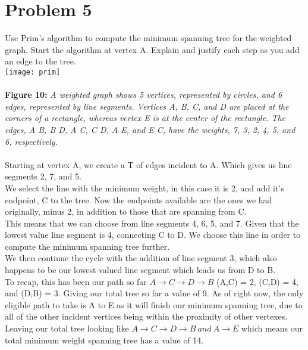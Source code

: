   \section*{Problem 5}
  Use Prim's algorithm to compute the minimum spanning tree for the weighted graph. Start the algorithm at vertex A. Explain and justify each step as you add an edge to the tree.
\\
\texttt{[image: prim]}
\\\\
{\color{blue} {\bf Figure 10:} \emph{A weighted graph shows 5 vertices, represented by circles, and 6 edges, represented by line segments. Vertices A, B, C, and D are placed at the corners of a rectangle, whereas vertex E is at the center of the rectangle. The edges, A B, B D, A C, C D, A E, and E C, have the weights, 7, 3, 2, 4, 5, and 6, respectively.
  }
}
\\\\
  Starting at vertex A, we create a T of edges incident to A. Which gives us line segments 2, 7, and 5. \\
  
  We select the line with the minimum weight, in this case it is 2, and add it's endpoint, C to the tree. Now the endpoints available are the ones we had originally, minus 2, in addition to those that are spanning from C.\\
  
  This means that we can choose from line segments 4, 6, 5, and 7. Given that the lowest value line segment is 4, connecting C to D. We choose this line in order to compute the minimum spanning tree further. \\
  
  We then continue the cycle with the addition of line segment 3, which also happens to be our lowest valued line segment which leads us from D to B. \\
  
  To recap, this has been our path so far $A \to C \to D \to B$ (A,C) = 2, (C,D) = 4, and (D,B) = 3. Giving our total tree so far a value of 9. As of right now, the only eligible path to take is A to E as it will finish our minimum spanning tree, due to all of the other incident vertices being within the proximity of other vertexes. \\
  
  Leaving our total tree looking like $A \to C \to D \to B \ and \ A \to E$ which means our total minimum weight spanning tree has a value of 14.
\\\\
 \newpage
